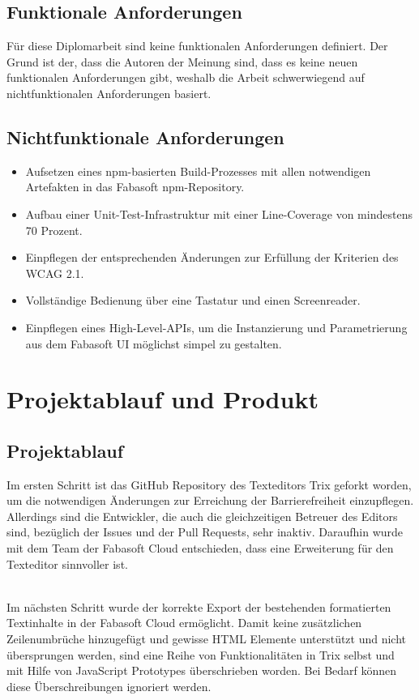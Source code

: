 \subsection{Funktionale Anforderungen}
Für diese Diplomarbeit sind keine funktionalen Anforderungen definiert. Der Grund ist der, dass die Autoren der Meinung sind, dass es keine neuen funktionalen Anforderungen gibt, weshalb die Arbeit schwerwiegend auf nichtfunktionalen Anforderungen basiert.

\subsection{Nichtfunktionale Anforderungen}

\begin{itemize}
	\item Aufsetzen eines npm-basierten Build-Prozesses mit allen notwendigen Artefakten in das Fabasoft npm-Repository.
	\item Aufbau einer Unit-Test-Infrastruktur mit einer Line-Coverage von mindestens 70 Prozent.
	\item Einpflegen der entsprechenden Änderungen zur Erfüllung der Kriterien des WCAG 2.1.
	\item Vollständige Bedienung über eine Tastatur und einen Screenreader.
	\item Einpflegen eines High-Level-APIs, um die Instanzierung und Parametrierung aus dem Fabasoft UI möglichst simpel zu gestalten.
\end{itemize}

\section{Projektablauf und Produkt}
\subsection{Projektablauf}
Im ersten Schritt ist das GitHub Repository des Texteditors Trix geforkt worden, um die notwendigen Änderungen zur Erreichung der Barrierefreiheit einzupflegen. Allerdings sind die Entwickler, die auch die gleichzeitigen Betreuer des Editors sind, bezüglich der Issues und der Pull Requests, sehr inaktiv. Daraufhin wurde mit dem Team der Fabasoft Cloud entschieden, dass eine Erweiterung für den Texteditor sinnvoller ist.

\mbox{}\\Im nächsten Schritt wurde der korrekte Export der bestehenden formatierten Textinhalte in der Fabasoft Cloud ermöglicht. Damit keine zusätzlichen Zeilenumbrüche hinzugefügt und gewisse HTML Elemente unterstützt und nicht übersprungen werden, sind eine Reihe von Funktionalitäten in Trix selbst und mit Hilfe von JavaScript Prototypes überschrieben worden. Bei Bedarf können diese Überschreibungen ignoriert werden.


